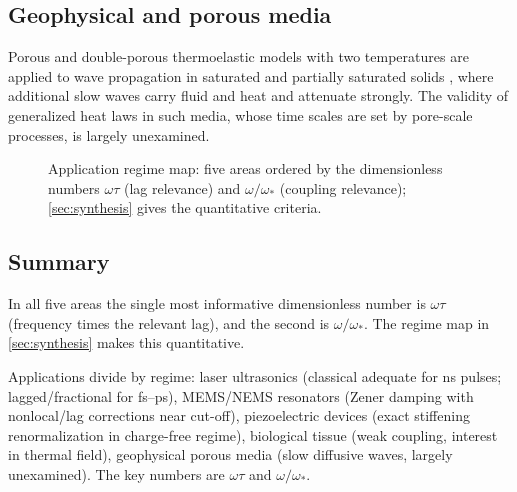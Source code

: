 \subsection{Geophysical and porous media}
Porous and double-porous thermoelastic models with two temperatures are applied to wave propagation in saturated and partially saturated solids \citep{Singh2020,Kumar2022,Kumar2025}, where additional slow waves carry fluid and heat and attenuate strongly. The validity of generalized heat laws in such media, whose time scales are set by pore-scale processes, is largely unexamined.

\begin{figure}[t!]\centering\small

\caption{Application regime map: five areas ordered by the dimensionless numbers $\omega\tau$ (lag relevance) and $\omega/\omega_*$ (coupling relevance); \cref{sec:synthesis} gives the quantitative criteria.}\label{fig:applications-geo}
\end{figure}

\subsection{Summary}
In all five areas the single most informative dimensionless number is $\omega\tau$ (frequency times the relevant lag), and the second is $\omega/\omega_*$. The regime map in \cref{sec:synthesis} makes this quantitative.

\begin{summarybox}[Summary]
Applications divide by regime: laser ultrasonics (classical adequate for ns pulses; lagged/fractional for fs--ps), MEMS/NEMS resonators (Zener damping with nonlocal/lag corrections near cut-off), piezoelectric devices (exact stiffening renormalization in charge-free regime), biological tissue (weak coupling, interest in thermal field), geophysical porous media (slow diffusive waves, largely unexamined). The key numbers are $\omega\tau$ and $\omega/\omega_*$.
\end{summarybox}
